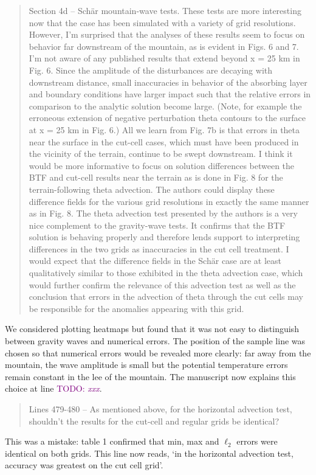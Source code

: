 \documentclass{article}
\newcommand{\TODO}[1]{\textcolor{purple}{TODO: \emph{#1}}}
\begin{document}
\begin{quotation}
	Section 4d -- Sch\"{a}r mountain-wave tests. These tests are more interesting now that 
 the case has been simulated with a variety of grid resolutions. However, I'm 
 surprised that the analyses of these results seem to focus on behavior far 
 downstream of the mountain, as is evident in Figs. 6 and 7. I'm not aware of any 
 published results that extend beyond x = 25 km in Fig. 6. Since the amplitude of the 
 disturbances are decaying with downstream distance, small inaccuracies in behavior 
 of the absorbing layer and boundary conditions have larger impact such that the 
 relative errors in comparison to the analytic solution become large. (Note, for 
 example the erroneous extension of negative perturbation theta contours to the 
 surface at x = 25 km in Fig. 6.)  All we learn from Fig. 7b is that errors in theta near 
 the surface in the cut-cell cases, which must have been produced in the vicinity of the 
 terrain, continue to be swept downstream. I think it would be more informative to 
 focus on solution differences between the BTF and cut-cell results near the terrain as 
 is done in Fig. 8 for the terrain-following theta advection. The authors could display 
 these difference fields for the various grid resolutions in exactly the same manner as 
 in Fig. 8. The theta advection test presented by the authors is a very nice complement 
 to the gravity-wave tests. It confirms that the BTF solution is behaving properly and 
 therefore lends support to interpreting differences in the two grids as inaccuracies in 
 the cut cell treatment. I would expect that the difference fields in the Sch\"{a}r case are 
 at least qualitatively similar to those exhibited in the theta advection case, which 
 would further confirm the relevance of this advection test as well as the conclusion 
 that errors in the advection of theta through the cut cells may be responsible for the 
 anomalies appearing with this grid.
\end{quotation}
We considered plotting heatmaps but found that it was not easy to distinguish between gravity waves and numerical errors.  The position of the sample line was chosen so that numerical errors would be revealed more clearly: far away from the mountain, the wave amplitude is small but the potential temperature errors remain constant in the lee of the mountain.  The manuscript now explains this choice at line \TODO{xxx}.

\begin{quotation}
 Lines 479-480 -- As mentioned above, for the horizontal advection test, shouldn't the  results for the cut-cell and regular grids be identical?
\end{quotation}
This was a mistake: table 1 confirmed that min, max and $\ell_2$ errors were identical on both grids.  This line now reads, `in the horizontal advection test, accuracy was greatest on the cut cell grid'.
\end{document}
